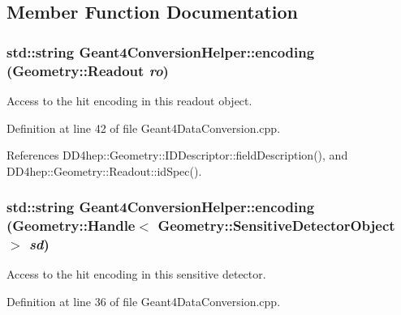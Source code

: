 \subsection{Member Function Documentation}
\hypertarget{class_d_d4hep_1_1_simulation_1_1_geant4_conversion_helper_aba7692df239d8234dbab1ad724b149a3}{
\subsubsection[{encoding}]{\setlength{\rightskip}{0pt plus 5cm}std::string Geant4ConversionHelper::encoding ({\bf Geometry::Readout} {\em ro})}}
\label{class_d_d4hep_1_1_simulation_1_1_geant4_conversion_helper_aba7692df239d8234dbab1ad724b149a3}


Access to the hit encoding in this readout object. 

Definition at line 42 of file Geant4DataConversion.cpp.

References DD4hep::Geometry::IDDescriptor::fieldDescription(), and DD4hep::Geometry::Readout::idSpec().\hypertarget{class_d_d4hep_1_1_simulation_1_1_geant4_conversion_helper_a90f912fdcfa4e17d2179e714318b53e4}{
\subsubsection[{encoding}]{\setlength{\rightskip}{0pt plus 5cm}std::string Geant4ConversionHelper::encoding ({\bf Geometry::Handle}$<$ {\bf Geometry::SensitiveDetectorObject} $>$ {\em sd})}}
\label{class_d_d4hep_1_1_simulation_1_1_geant4_conversion_helper_a90f912fdcfa4e17d2179e714318b53e4}


Access to the hit encoding in this sensitive detector. 

Definition at line 36 of file Geant4DataConversion.cpp.

